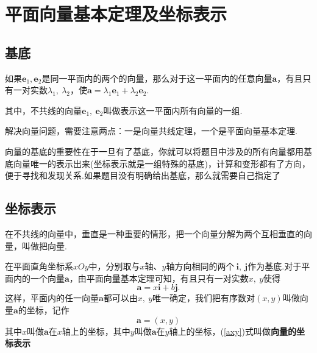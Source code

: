 \documentclass{BHCexam}
\begin{document}
\section{平面向量基本定理及坐标表示}
\subsection{基底}
\begin{Theroem}[平面向量基本定理]
如果$ \bm{e}_1,\bm{e}_2 $是同一平面内的两个的向量，那么对于这一平面内的任意向量$ \bm{a} $，有且只有一对实数$ \lambda_1,~\lambda_2 $，使$\bm{a}=\lambda_1\bm{e}_1+\lambda_2\bm{e}_2$.\par 其中，不共线的向量$ \bm{e}_1,~\bm{e}_2 $叫做表示这一平面内所有向量的一组.
\end{Theroem}
{\kaishu 解决向量问题，需要注意两点：一是向量共线定理，一个是平面向量基本定理.\par
向量的基底的重要性在于一旦有了基底，你就可以将题目中涉及的所有向量都用基底向量唯一的表示出来(坐标表示就是一组特殊的基底)，计算和变形都有了方向，便于寻找和发现关系.如果题目没有明确给出基底，那么就需要自己指定了}

\subsection{坐标表示}
在不共线的向量中，垂直是一种重要的情形，把一个向量分解为两个互相垂直的向量，叫做把向量.\par
在平面直角坐标系$xOy$中，分别取与$x$轴、$y$轴方向相同的两个$~ \bm{i},~\bm{j} $作为基底.对于平面内的一个向量$ \bm{a} $，由平面向量基本定理可知，有且只有一对实数$ x,~y $使得\[\bm{a}=x\bm{i}+b\bm{j}.\]
这样，平面内的任一向量$ \bm{a} $都可以由$ x,~y $唯一确定，我们把有序数对$ (x,y) $叫做向量$\bm{a}  $的坐标，记作\begin{equation}\label{axy}
\bm{a}=(x,y)
\end{equation}其中$ x $叫做$ \bm{a} $在$x$轴上的坐标，其中$ y $叫做$ \bm{a} $在$y$轴上的坐标，(\ref{axy})式叫做\textbf{向量的坐标表示}
\begin{center}
\end{center}
\end{document}
